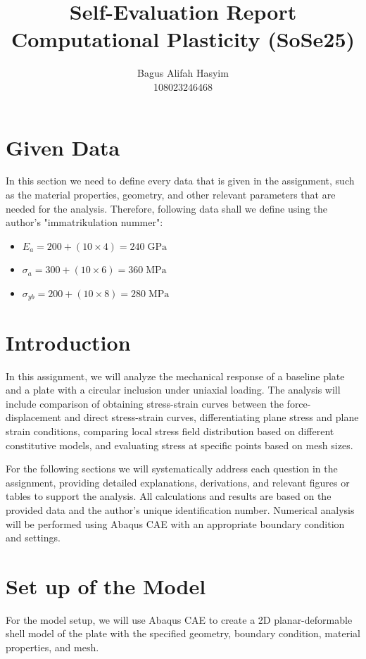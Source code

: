 \documentclass[12pt]{article}
\title{Self-Evaluation Report \\ \large Computational Plasticity (SoSe25)}
\author{Bagus Alifah Hasyim \\ 108023246468}
\date{}
\begin{document}
\maketitle

\section*{Given Data}
\hspace*{2em}In this section we need to define every data that is given in the assignment, such as the material properties, geometry, 
and other relevant parameters that are needed for the analysis. Therefore, following data shall we define using the author's "immatrikulation nummer":

\begin{itemize}
    \item $E_a = 200 + (10 \times 4) = 240 \;\text{GPa}$  
    \item $\sigma_a = 300 + (10 \times 6) = 360 \;\text{MPa}$
    \item $\sigma_{yb} = 200 + (10 \times 8) = 280 \;\text{MPa}$
\end{itemize}

\section{Introduction}
\hspace*{2em}In this assignment, we will analyze the mechanical response of a baseline plate
and a plate with a circular inclusion under uniaxial loading. 
The analysis will include comparison of obtaining stress-strain curves between the force-displacement and
direct stress-strain curves, differentiating plane stress and plane strain conditions, comparing 
local stress field distribution based on different constitutive models, and evaluating stress at specific points based on mesh sizes.

\hspace*{2em}For the following sections we will systematically address each question in the assignment, 
providing detailed explanations, derivations, and relevant figures or tables to 
support the analysis. 
All calculations and results are based on the provided data and the author's unique 
identification number. Numerical analysis will be performed using Abaqus CAE with an appropriate
boundary condition and settings. 


\section{Set up of the Model}
\hspace*{2em}For the model setup, we will use Abaqus CAE to create a 2D planar-deformable shell model of the plate with the specified geometry, boundary condition, material properties, and mesh.  
\end{document}
